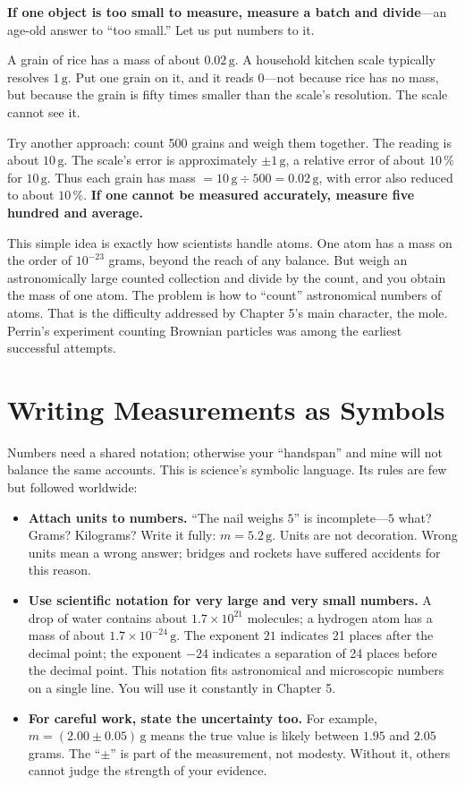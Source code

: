 \begin{qiaoliang}
\textbf{If one object is too small to measure, measure a batch and divide}---an age-old answer to ``too small.'' Let us put numbers to it.

A grain of rice has a mass of about $0.02\,\mathrm{g}$. A household kitchen scale typically resolves $1\,\mathrm{g}$. Put one grain on it, and it reads $0$---not because rice has no mass, but because the grain is fifty times smaller than the scale's resolution. The scale cannot see it.

Try another approach: count 500 grains and weigh them together. The reading is about $10\,\mathrm{g}$. The scale's error is approximately $\pm 1\,\mathrm{g}$, a relative error of about $10\,\%$ for $10\,\mathrm{g}$. Thus each grain has mass $=10\,\mathrm{g}\div 500=0.02\,\mathrm{g}$, with error also reduced to about $10\,\%$. \textbf{If one cannot be measured accurately, measure five hundred and average.}

This simple idea is exactly how scientists handle atoms. One atom has a mass on the order of $10^{-23}$ grams, beyond the reach of any balance. But weigh an astronomically large counted collection and divide by the count, and you obtain the mass of one atom. The problem is how to ``count'' astronomical numbers of atoms. That is the difficulty addressed by Chapter 5's main character, the mole. Perrin's experiment counting Brownian particles was among the earliest successful attempts.
\end{qiaoliang}

\section{Writing Measurements as Symbols}

Numbers need a shared notation; otherwise your ``handspan'' and mine will not balance the same accounts. This is science's symbolic language. Its rules are few but followed worldwide:

\begin{itemize}[itemsep=2pt]
\item \textbf{Attach units to numbers.} ``The nail weighs $5$'' is incomplete---$5$ what? Grams? Kilograms? Write it fully: $m = 5.2\,\mathrm{g}$. Units are not decoration. Wrong units mean a wrong answer; bridges and rockets have suffered accidents for this reason.
\item \textbf{Use scientific notation for very large and very small numbers.} A drop of water contains about $1.7\times 10^{21}$ molecules; a hydrogen atom has a mass of about $1.7\times 10^{-24}\,\mathrm{g}$. The exponent $21$ indicates 21 places after the decimal point; the exponent $-24$ indicates a separation of 24 places before the decimal point. This notation fits astronomical and microscopic numbers on a single line. You will use it constantly in Chapter 5.
\item \textbf{For careful work, state the uncertainty too.} For example, $m = (2.00 \pm 0.05)\,\mathrm{g}$ means the true value is likely between $1.95$ and $2.05$ grams. The ``$\pm$'' is part of the measurement, not modesty. Without it, others cannot judge the strength of your evidence.
\end{itemize}

